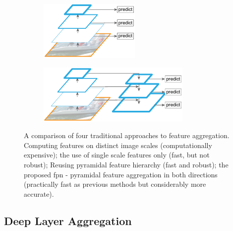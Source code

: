 \begin{figure}
  \begin{subfigure}[t]{0.4\textwidth}
    \centering
    \includegraphics[width=\textwidth]{figures/theoretical_foundations/fpn_pyramidal_feature_hierarchy.pdf}
    \caption[]{}
  \end{subfigure}
  \hfill
  \begin{subfigure}[t]{0.4\textwidth}
    \centering
    \includegraphics[width=\textwidth]{figures/theoretical_foundations/fpn_feature_pyramid_network.pdf}
    \caption[]{}
  \end{subfigure}
  \caption[\gls{fpn}]{A comparison of four traditional approaches to feature aggregation.  Computing features on distinct image scales (computationally expensive);  the use of single scale features only (fast, but not robust);  Reusing pyramidal feature hierarchy (fast and robust);  the proposed \gls{fpn} - pyramidal feature aggregation in both directions (practically fast as previous methods but considerably more accurate). }
  \label{fig:FPNVariousApproaches}
\end{figure}

\subsection{Deep Layer Aggregation}
\label{ssec:DeepLayerAggregation}

